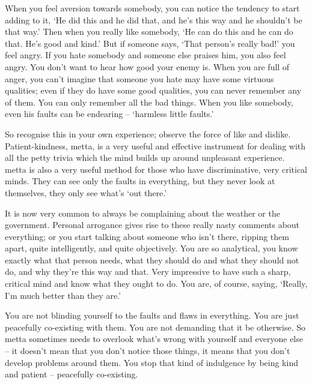 When you feel aversion towards somebody, you can notice the tendency to start adding to it, `He did this and he did that, and he's this way and he shouldn't be that way.' Then when you really like somebody, `He can do this and he can do that. He's good and kind.' But if someone says, `That person's really bad!' you feel angry. If you hate somebody and someone else praises him, you also feel angry. You don't want to hear how good your enemy is. When you are full of anger, you can't imagine that someone you hate may have some virtuous qualities; even if they do have some good qualities, you can never remember any of them. You can only remember all the bad things. When you like somebody, even his faults can be endearing -- `harmless little faults.'

So recognise this in your own experience; observe the force of like and dislike. Patient-kindness, metta, is a very useful and effective instrument for dealing with all the petty trivia which the mind builds up around unpleasant experience. metta is also a very useful method for those who have discriminative, very critical minds. They can see only the faults in everything, but they never look at themselves, they only see what's `out there.'

It is now very common to always be complaining about the weather or the government. Personal arrogance gives rise to these really nasty comments about everything; or you start talking about someone who isn't there, ripping them apart, quite intelligently, and quite objectively. You are so analytical, you know exactly what that person needs, what they should do and what they should not do, and why they're this way and that. Very impressive to have such a sharp, critical mind and know what they ought to do. You are, of course, saying, `Really, I'm much better than they are.'

You are not blinding yourself to the faults and flaws in everything. You are just peacefully co-existing with them. You are not demanding that it be otherwise. So metta sometimes needs to overlook what's wrong with yourself and everyone else -- it doesn't mean that you don't notice those things, it means that you don't develop problems around them. You stop that kind of indulgence by being kind and patient -- peacefully co-existing.


